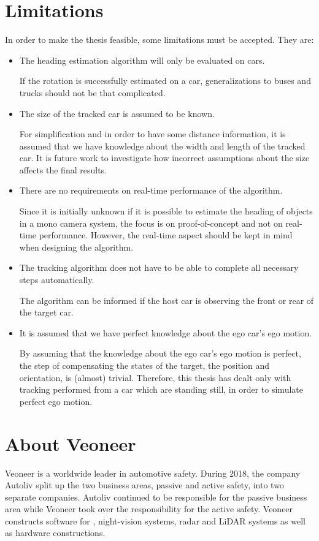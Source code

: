 \section{Limitations}
In order to make the thesis feasible, some limitations must be accepted. They are:

\begin{itemize}	
	\item The heading estimation algorithm will only be evaluated on cars.

	If the rotation is successfully estimated on a car, generalizations to \eg buses and trucks should not be that complicated.

	\item The size of the tracked car is assumed to be known.

	For simplification and in order to have some  distance information, it is assumed that we have knowledge about the width and length of the tracked car.
	It is future work to investigate how incorrect assumptions about the size affects the final results.

	\item There are no requirements on real-time performance of the algorithm.

	Since it is initially unknown if it is possible to estimate the heading of objects in a mono camera system, the focus is on proof-of-concept and not on real-time performance.
	However, the real-time aspect should be kept in mind when designing the algorithm.

    \item The tracking algorithm does not have to be able to complete all necessary steps automatically.

    The algorithm can \eg be informed if the host car is observing the front or rear of the target car.

	\item It is assumed that we have perfect knowledge about the ego car's ego motion.

	By assuming that the knowledge about the ego car's ego motion is perfect, the step of compensating the states of the target, \ie the position and orientation, is (almost) trivial.
	Therefore, this thesis has dealt only with tracking performed from a car which are standing still, in order to simulate perfect ego motion.
\end{itemize}

\newpage

\section{About Veoneer}
Veoneer is a worldwide leader in automotive safety.
During 2018, the company Autoliv split up the two business areas, passive and active safety, into two separate companies.
Autoliv continued to be responsible for the passive business area while Veoneer took over the responsibility for the active safety.
Veoneer constructs software for \abbrADAS, night-vision systems, radar and LiDAR systems as well as hardware constructions.
\cite{Veoneer:2018}

